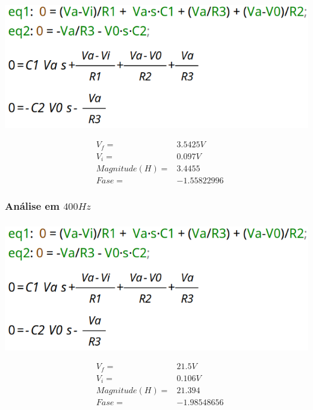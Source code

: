 \documentclass[12pt,twoside, a4paper, twocolumn]{article}
\begin{document}
\begin{adjustbox}{scale=0.18}
    \includegraphics{eqs.png}
\end{adjustbox}




\begin{equation*}
    \begin{aligned}
         & V_f =          & 3.5425V     \\
         & V_i =          & 0.097V      \\
         & Magnitude(H) = & 3.4455      \\
         & Fase =         & -1.55822996
    \end{aligned}
\end{equation*}




\subsubsection{Análise em $400Hz$}
\subparagraph*{}




\begin{adjustbox}{scale=0.18}
    \includegraphics{eqs.png}
\end{adjustbox}




\begin{equation*}
    \begin{aligned}
         & V_f =          & 21.5V       \\
         & V_i =          & 0.106V      \\
         & Magnitude(H) = & 21.394      \\
         & Fase =         & -1.98548656
    \end{aligned}
\end{equation*}
\end{document}
